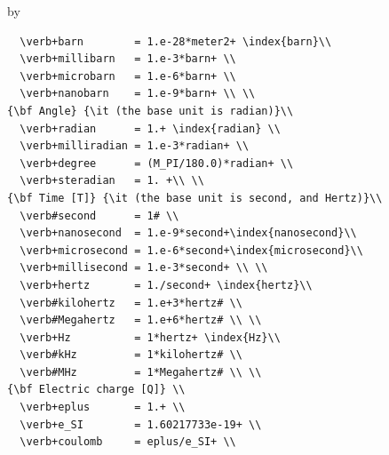 \documentclass[twoside]{article}
\newcommand{\entrylabel}[1]{\mbox{\textbf{{#1}}}\hfil}%
\newenvironment{entry}
{\begin{list}{}%
    {\renewcommand{\makelabel}{\entrylabel}%
     \setlength{\labelwidth}{90pt}%
     \setlength{\leftmargin}{\labelwidth}
     \advance\leftmargin by \labelsep%
      }%
    }%
  {\end{list}}
\newcommand{\Entrylabel}[1]%
{\raisebox{0pt}[1ex][0pt]{\makebox[\labelwidth][l]%
    {\parbox[t]{\labelwidth}{\hspace{0pt}\textbf{{#1}}}}}}
\newenvironment{Entry}%
{\renewcommand{\entrylabel}{\Entrylabel}\begin{entry}}%
  {\end{entry}}
\begin{document}
\begin{description}
\begin{Entry}
\begin{verbatim}
  \verb+barn        = 1.e-28*meter2+ \index{barn}\\           
  \verb+millibarn   = 1.e-3*barn+ \\  
  \verb+microbarn   = 1.e-6*barn+ \\
  \verb+nanobarn    = 1.e-9*barn+ \\ \\ 
{\bf Angle} {\it (the base unit is radian)}\\
  \verb+radian      = 1.+ \index{radian} \\ 
  \verb+milliradian = 1.e-3*radian+ \\ 
  \verb+degree      = (M_PI/180.0)*radian+ \\
  \verb+steradian   = 1. +\\ \\
{\bf Time [T]} {\it (the base unit is second, and Hertz)}\\
  \verb#second      = 1# \\
  \verb+nanosecond  = 1.e-9*second+\index{nanosecond}\\ 
  \verb+microsecond = 1.e-6*second+\index{microsecond}\\ 
  \verb+millisecond = 1.e-3*second+ \\ \\ 
  \verb+hertz       = 1./second+ \index{hertz}\\ 
  \verb#kilohertz   = 1.e+3*hertz# \\
  \verb#Megahertz   = 1.e+6*hertz# \\ \\
  \verb+Hz          = 1*hertz+ \index{Hz}\\ 
  \verb#kHz         = 1*kilohertz# \\
  \verb#MHz         = 1*Megahertz# \\ \\
{\bf Electric charge [Q]} \\
  \verb+eplus       = 1.+ \\
  \verb+e_SI        = 1.60217733e-19+ \\
  \verb+coulomb     = eplus/e_SI+ \\
  

\end{verbatim}
\end{Entry}
\end{description}
\end{document}
